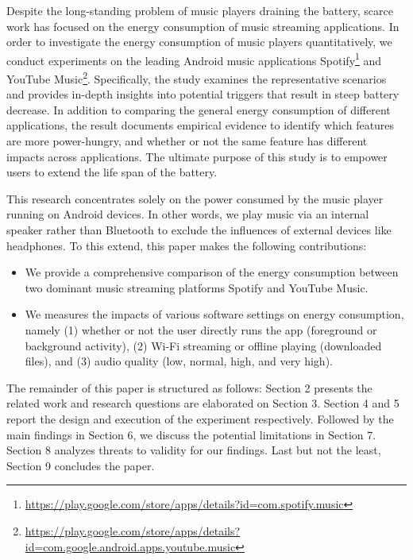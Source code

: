 Despite the long-standing problem of music players draining the battery, scarce work has focused on the energy consumption of music streaming applications. In order to investigate the energy consumption of music players quantitatively, we conduct experiments on the leading Android music applications Spotify\footnote{\label{note1}\href{ https://play.google.com/store/apps/details?id=com.spotify.music}{https://play.google.com/store/apps/details?id=com.spotify.music}} and YouTube Music\footnote{\label{note1}\href{ https://play.google.com/store/apps/details?id=com.google.android.apps.youtube.music}{https://play.google.com/store/apps/details?id=com.google.android.apps.youtube.music}}. Specifically, the study examines the representative scenarios and provides in-depth insights into potential triggers that result in steep battery decrease. In addition to comparing the general energy consumption of different applications, the result documents empirical evidence to identify which features are more power-hungry, and whether or not the same feature has different impacts across applications. The ultimate purpose of this study is to empower users to extend the life span of the battery. 

This research concentrates solely on the power consumed by the music player running on Android devices. In other words, we play music via an internal speaker rather than Bluetooth to exclude the influences of external devices like headphones. To this extend, this paper makes the following contributions: 
\begin{itemize}
\item We provide a comprehensive comparison of the energy consumption between two dominant music streaming platforms Spotify and YouTube Music. 
\item We measures the impacts of various software settings on energy consumption, namely (1) whether or not the user directly runs the app (\ie foreground or background activity), (2) Wi-Fi streaming or offline playing (\ie downloaded files), and (3) audio quality (\ie low, normal, high, and very high). 
\end{itemize}

The remainder of this paper is structured as follows: Section 2 presents the related work and research questions are elaborated on Section 3. Section 4 and 5 report the design and execution of the experiment respectively. Followed by the main findings in Section 6, we discuss the potential limitations in Section 7. Section 8 analyzes threats to validity for our findings. Last but not the least, Section 9 concludes the paper. 

